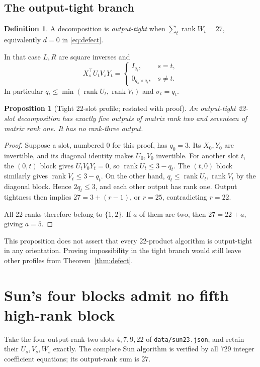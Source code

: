 \documentclass[11pt]{article}
\newtheorem{proposition}[theorem]{Proposition}
\theoremstyle{definition}\newtheorem{definition}[theorem]{Definition}
\newcommand{\rank}{\operatorname{rank}}
\newcommand{\file}[1]{\nolinkurl{#1}}
\begin{document}
\subsection{The output-tight branch}
\begin{definition}
A decomposition is \emph{output-tight} when $\sum_t\rank W_t=27$, equivalently $d=0$ in \eqref{eq:defect}.
\end{definition}
In that case $L,R$ are square inverses and
\begin{equation}\label{eq:blocks}
X_s^\top U_tV_sY_t=\begin{cases}I_{q_t},&s=t,\\0_{q_s\times q_t},&s\ne t.\end{cases}
\end{equation}
In particular $q_t\le\min(\rank U_t,\rank V_t)$ and $\sigma_t=q_t$.

\begin{proposition}[Tight 22-slot profile; restated with proof]\label{prop:profile}
An output-tight 22-slot decomposition has exactly five outputs of matrix rank two and seventeen of matrix rank one. It has no rank-three output.
\end{proposition}
\begin{proof}
Suppose a slot, numbered 0 for this proof, has $q_0=3$. Its $X_0,Y_0$ are invertible, and its diagonal identity makes $U_0,V_0$ invertible. For another slot $t$, the $(0,t)$ block gives $U_tV_0Y_t=0$, so $\rank U_t\le3-q_t$. The $(t,0)$ block similarly gives $\rank V_t\le3-q_t$. On the other hand, $q_t\le\rank U_t,\rank V_t$ by the diagonal block. Hence $2q_t\le3$, and each other output has rank one. Output tightness then implies $27=3+(r-1)$, or $r=25$, contradicting $r=22$.

All 22 ranks therefore belong to $\{1,2\}$. If $a$ of them are two, then $27=22+a$, giving $a=5$.
\end{proof}

This proposition does not assert that every 22-product algorithm is output-tight in any orientation. Proving impossibility in the tight branch would still leave other profiles from Theorem~\ref{thm:defect}.

\section{Sun's four blocks admit no fifth high-rank block}\label{sec:sun}
Take the four output-rank-two slots $4,7,9,22$ of \file{data/sun23.json}, and retain their $U_s,V_s,W_s$ exactly. The complete Sun algorithm is verified by all 729 integer coefficient equations; its output-rank sum is 27.
\end{document}
